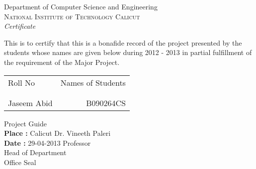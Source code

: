 \newpage
\thispagestyle{empty}

\begin{center}

\huge{Department of Computer Science and Engineering}\\[0.5cm]
\normalsize
\textsc{National Institute of Technology Calicut}\\[2.0cm]

\emph{\LARGE Certificate}\\[2.5cm]
\end{center}
\normalsize
This is to certify that this is a bonafide record of the project presented by
the students whose names are given below during 2012 - 2013 in partial
fulfillment of the requirement
of the Major Project.\\[1.0cm]

\begin{table}[h]
\centering
\begin{tabular}{lr}
Roll No & Names of Students \\ \\ \hline
\\
Jaseem Abid & B090264CS
\end{tabular}
\end{table}

\vspace*{1.0cm}
\noindent

\hfill Project Guide\\
\textbf{Place :} Calicut \hfill Dr. Vineeth Paleri\\
\textbf{Date :} 29-04-2013 \hfill Professor\\

\vspace*{1.0cm}
\hfill Head of Department\\

\vspace*{1.5cm}
\hfill Office Seal

\nopagebreak
